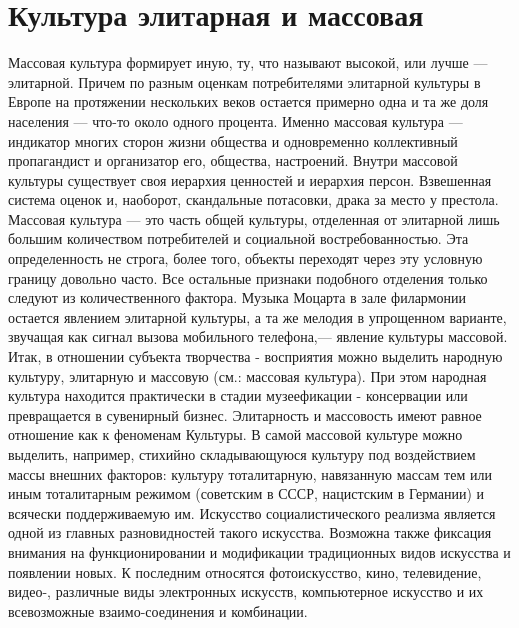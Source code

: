 \documentclass[12pt]{article}
\begin{document}
\newpage
\section{Культура элитарная и массовая}
Массовая культура формирует иную, ту, что называют высокой, или лучше — элитарной. Причем по разным
оценкам потребителями элитарной культуры в Европе на протяжении нескольких веков остается примерно одна
и та же доля населения — что-то около одного процента. Именно массовая культура — индикатор многих
сторон жизни общества и одновременно коллективный пропагандист и организатор его, общества, настроений.
Внутри  массовой  культуры  существует  своя  иерархия  ценностей  и  иерархия  персон.  Взвешенная  система
оценок и, наоборот, скандальные потасовки, драка за место у престола.
Массовая  культура  —  это  часть  общей  культуры,  отделенная  от  элитарной  лишь  большим  количеством
потребителей и социальной востребованностью. Эта определенность не строга, более того, объекты переходят
через эту условную границу довольно часто. Все остальные признаки подобного отделения только следуют из
количественного фактора.
Музыка Моцарта в зале филармонии остается явлением элитарной культуры, а та же мелодия в упрощенном
варианте, звучащая как сигнал вызова мобильного телефона,— явление культуры массовой.
Итак,  в  отношении  субъекта  творчества  -  восприятия  можно  выделить  народную  культуру,  элитарную  и
массовую (см.: массовая культура). При этом народная культура находится практически в стадии музеефикации
- консервации или превращается в сувенирный бизнес.
Элитарность и массовость имеют равное отношение как к феноменам Культуры. В самой массовой культуре
можно выделить, например, стихийно складывающуюся культуру под воздействием массы внешних факторов:
культуру  тоталитарную,  навязанную  массам  тем  или  иным  тоталитарным  режимом  (советским  в  СССР,
нацистским в Германии) и всячески поддерживаемую им. Искусство социалистического реализма является
одной из главных разновидностей такого искусства.
Возможна также фиксация внимания на функционировании и модификации традиционных видов искусства и
появлении  новых.  К  последним  относятся  фотоискусство,  кино,  телевидение,  видео-,  различные  виды
электронных искусств, компьютерное искусство и их всевозможные взаимо-соединения и комбинации. 

\newpage
\end{document}
